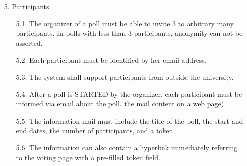 \begin{enumerate}
%
%	
%	
%	
%	
%	
%	




\item[5.] Participants

	\begin{enumerate}
	\item[5.1.] The organizer of a poll must be able to invite 3 to arbitrary many participants. In polls with
	less than 3 participants, anonymity can not be asserted. %
	
	
	\item[5.2.] Each participant must be identified by her email address. %
	
	
	\item[5.3.] The system shall support participants from outside the university. %
	
	
	\item[5.4.] After a poll is STARTED by the organizer, each participant must be informed via email about
	the poll. %
	the mail content on a web page)
	
	
	\item[5.5.] The information mail must include the title of the poll, the start and end dates, the number of
	participants, and a token. %
	
	
	\item[5.6.] The information can also contain a hyperlink immediately referring to the voting page with a
	pre-filled token field. %
	\end{enumerate}





\end{enumerate}
